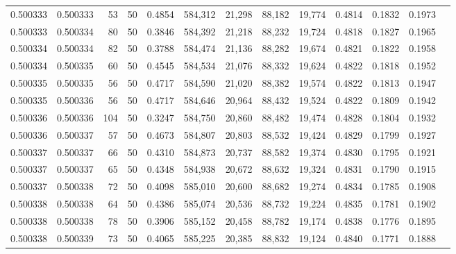 \begin{tabular}{rrrrrrrrrrrrr}
0.500333 & 0.500333 &    53 &  50 &                                     0.4854 & 584,312 &  21,298 &  88,182 &  19,774 & 0.4814 & 0.1832 & 0.1973 \\
0.500333 & 0.500334 &    80 &  50 &                                     0.3846 & 584,392 &  21,218 &  88,232 &  19,724 & 0.4818 & 0.1827 & 0.1965 \\
0.500334 & 0.500334 &    82 &  50 &                                     0.3788 & 584,474 &  21,136 &  88,282 &  19,674 & 0.4821 & 0.1822 & 0.1958 \\
0.500334 & 0.500335 &    60 &  50 &                                     0.4545 & 584,534 &  21,076 &  88,332 &  19,624 & 0.4822 & 0.1818 & 0.1952 \\
0.500335 & 0.500335 &    56 &  50 &                                     0.4717 & 584,590 &  21,020 &  88,382 &  19,574 & 0.4822 & 0.1813 & 0.1947 \\
0.500335 & 0.500336 &    56 &  50 &                                     0.4717 & 584,646 &  20,964 &  88,432 &  19,524 & 0.4822 & 0.1809 & 0.1942 \\
0.500336 & 0.500336 &   104 &  50 &                                     0.3247 & 584,750 &  20,860 &  88,482 &  19,474 & 0.4828 & 0.1804 & 0.1932 \\
0.500336 & 0.500337 &    57 &  50 &                                     0.4673 & 584,807 &  20,803 &  88,532 &  19,424 & 0.4829 & 0.1799 & 0.1927 \\
0.500337 & 0.500337 &    66 &  50 &                                     0.4310 & 584,873 &  20,737 &  88,582 &  19,374 & 0.4830 & 0.1795 & 0.1921 \\
0.500337 & 0.500337 &    65 &  50 &                                     0.4348 & 584,938 &  20,672 &  88,632 &  19,324 & 0.4831 & 0.1790 & 0.1915 \\
0.500337 & 0.500338 &    72 &  50 &                                     0.4098 & 585,010 &  20,600 &  88,682 &  19,274 & 0.4834 & 0.1785 & 0.1908 \\
0.500338 & 0.500338 &    64 &  50 &                                     0.4386 & 585,074 &  20,536 &  88,732 &  19,224 & 0.4835 & 0.1781 & 0.1902 \\
0.500338 & 0.500338 &    78 &  50 &                                     0.3906 & 585,152 &  20,458 &  88,782 &  19,174 & 0.4838 & 0.1776 & 0.1895 \\
0.500338 & 0.500339 &    73 &  50 &                                     0.4065 & 585,225 &  20,385 &  88,832 &  19,124 & 0.4840 & 0.1771 & 0.1888 \\

\end{tabular}
